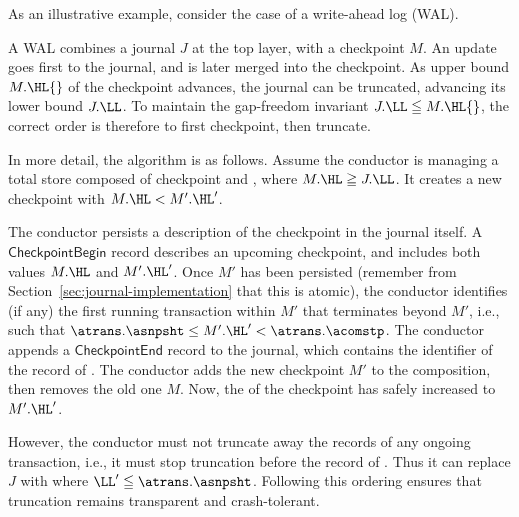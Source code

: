 As an illustrative example, consider the case of a write-ahead log
(WAL).

A WAL combines a journal $J$ at the top layer, with a checkpoint $M$.
An update goes first to the journal, and is later merged into the
checkpoint.
As upper bound $M.\HL{}$ of the checkpoint advances, the journal can
be truncated, advancing its lower bound $J.\LL$.
To maintain the gap-freedom invariant $J.\LL \leqq M.\HL{}$, the
correct order is therefore to first checkpoint, then truncate.

In more detail, the algorithm is as follows.
Assume the conductor is managing a total store composed of checkpoint
 and
, where $M.\HL \geqq J.\LL$.
It creates a new checkpoint  with
$M.\HL < M'.\HL'$.

The conductor persists a description of the checkpoint in the journal
itself.
A \ensuremath{\mathsf{CheckpointBegin}} record describes an upcoming
checkpoint, and includes both values $M.\HL$ and
$M'.\HL'$.
Once $M'$ has been persisted (remember from
Section~\ref{sec:journal-implementation} that this is atomic), the
conductor identifies (if any) the first running transaction \atrans{}
within $M'$ that terminates beyond $M'$, i.e., such that
$\atrans.\asnpsht \le M'.\HL' < \atrans.\acomstp$.
The conductor appends a \ensuremath{\mathsf{CheckpointEnd}} record to
the journal, which contains the identifier of the \jrnlBeginTag{} record
of \atrans{}.
The conductor adds the new checkpoint $M'$ to the composition, then removes
the old one $M$.
Now, the \highlookup{} of the checkpoint has safely increased to
$M'.\HL'$.

However, the conductor must not truncate away the records of any ongoing
transaction, i.e., it must stop truncation before the \jrnlBeginTag{}
record of \atrans{}.
Thus it can replace $J$ with 
where $\LL' \leqq \atrans.\asnpsht$.
Following this ordering ensures that truncation remains transparent and
crash-tolerant.

